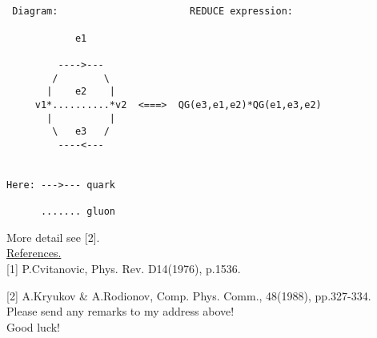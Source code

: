 \begin{verbatim}


 Diagram:                       REDUCE expression:

            e1

         ---->---
        /        \
       |    e2    |
     v1*..........*v2  <===>  QG(e3,e1,e2)*QG(e1,e3,e2)
       |          |
        \   e3   /
         ----<---


Here: --->--- quark

      ....... gluon

\end{verbatim}

More detail see {[}2{]}. \\
\underline{References.} \\ 
{[}1{]} P.Cvitanovic, Phys. Rev. D14(1976), p.1536.

{[}2{]} A.Kryukov \& A.Rodionov, Comp. Phys. Comm., 48(1988), pp.327-334.\\
Please send any remarks to my address above! \\
Good luck!
